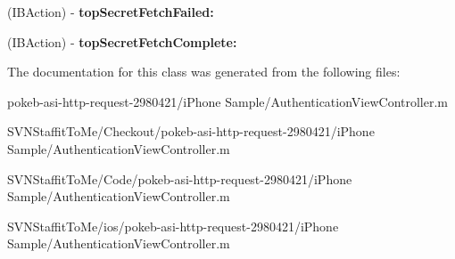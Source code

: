 \begin{DoxyCompactItemize}
\item 
\hypertarget{interface_authentication_view_controller_07_08_a57486b58cfda1c6ce94f774f3e12f34d}{
(\-I\-B\-Action) -\/ {\bfseries top\-Secret\-Fetch\-Failed\-:}}
\label{interface_authentication_view_controller_07_08_a57486b58cfda1c6ce94f774f3e12f34d}

\item 
\hypertarget{interface_authentication_view_controller_07_08_a88b1260bde333379e393d4542f3d253f}{
(\-I\-B\-Action) -\/ {\bfseries top\-Secret\-Fetch\-Complete\-:}}
\label{interface_authentication_view_controller_07_08_a88b1260bde333379e393d4542f3d253f}

\end{DoxyCompactItemize}


\-The documentation for this class was generated from the following files\-:\begin{DoxyCompactItemize}
\item 
pokeb-\/asi-\/http-\/request-\/2980421/i\-Phone Sample/\-Authentication\-View\-Controller.\-m\item 
\-S\-V\-N\-Staffit\-To\-Me/\-Checkout/pokeb-\/asi-\/http-\/request-\/2980421/i\-Phone Sample/\-Authentication\-View\-Controller.\-m\item 
\-S\-V\-N\-Staffit\-To\-Me/\-Code/pokeb-\/asi-\/http-\/request-\/2980421/i\-Phone Sample/\-Authentication\-View\-Controller.\-m\item 
\-S\-V\-N\-Staffit\-To\-Me/ios/pokeb-\/asi-\/http-\/request-\/2980421/i\-Phone Sample/\-Authentication\-View\-Controller.\-m\end{DoxyCompactItemize}
